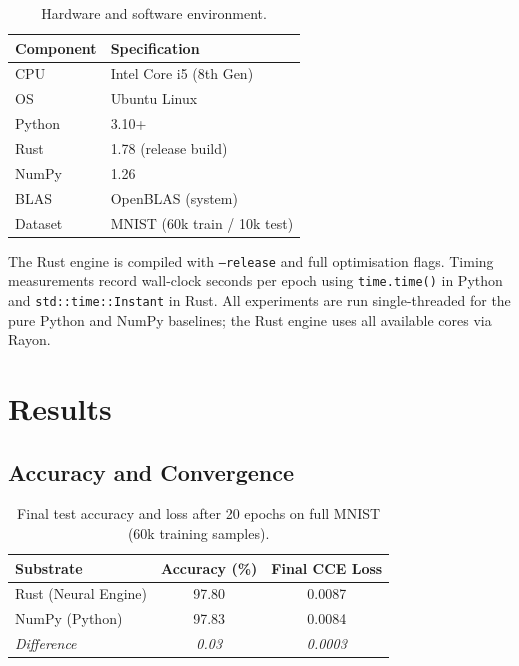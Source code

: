 \documentclass[11pt]{article}
\begin{document}
\begin{table}[ht]
\centering
\caption{Hardware and software environment.}
\label{tab:env}
\begin{tabular}{ll}
\toprule
\textbf{Component} & \textbf{Specification} \\
\midrule
CPU     & Intel Core i5 (8th Gen) \\
OS      & Ubuntu Linux \\
Python  & 3.10+ \\
Rust    & 1.78 (release build) \\
NumPy   & 1.26 \\
BLAS    & OpenBLAS (system) \\
Dataset & MNIST (60k train / 10k test) \\
\bottomrule
\end{tabular}
\end{table}

The Rust engine is compiled with \texttt{--release} and full optimisation flags. Timing measurements record wall-clock seconds per epoch using \texttt{time.time()} in Python and \texttt{std::time::Instant} in Rust. All experiments are run single-threaded for the pure Python and NumPy baselines; the Rust engine uses all available cores via Rayon.

\section{Results}

\subsection{Accuracy and Convergence}

\begin{table}[ht]
\centering
\caption{Final test accuracy and loss after 20 epochs on full MNIST (60k training samples).}
\label{tab:accuracy}
\begin{tabular}{lcc}
\toprule
\textbf{Substrate} & \textbf{Accuracy (\%)} & \textbf{Final CCE Loss} \\
\midrule
Rust (Neural Engine) & 97.80 & 0.0087 \\
NumPy (Python)       & 97.83 & 0.0084 \\
\midrule
\textit{Difference}  & \textit{0.03} & \textit{0.0003} \\
\bottomrule
\end{tabular}
\end{table}
\end{document}
